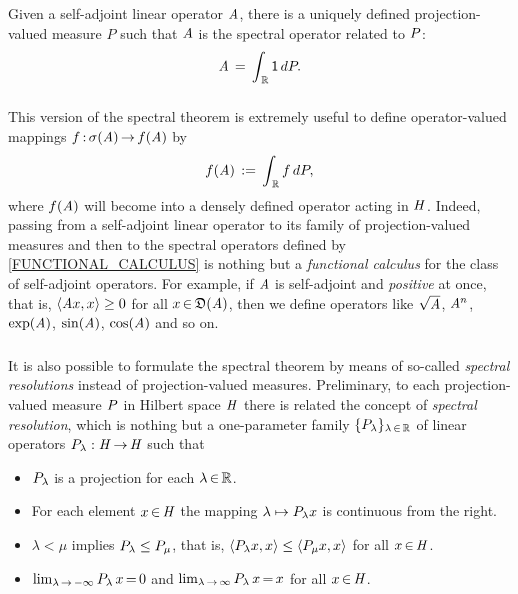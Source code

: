 \documentclass[11pt,twoside]{article}
\begin{document}
\begin{theorem}\label{SPECTRAL_THEOREM_VERSION_II}
Given a self-adjoint linear operator $\mathit{A}$,
there is a uniquely defined projection-valued measure $P$
such that $\mathit{A}$ is the spectral operator related to ${P}$:
\[
\mathit{A} \,=\, \int_{\,{\mathbb{R}}} {\mathsf{1}} \, d{P}.
\]
\end{theorem}

\subsubsection*{} %
This version of the spectral theorem is extremely useful
to define operator-valued mappings $f{\,:\,}\sigma(\mathit{A}) {\,\to\,} f(\mathit{A})$ by
\[
f(\mathit{A}) \,:=\, \int_{\,{\mathbb{R}}} f \, d{P},
\]
where $f(\mathit{A})$ will become into a densely defined operator
acting in $\mathit{H}$.
Indeed,
passing from a self-adjoint linear operator
to its family of projection-valued measures
and then to the spectral operators defined by \eqref{FUNCTIONAL_CALCULUS}
is nothing but a \textit{functional calculus}
for the class of self-adjoint operators.
For example, 
if $\mathit{A}$ is self-adjoint and \textit{positive} at once,
that is,
$\langle \mathit{A} x,x \rangle \geq 0$ for all $x {\,\in\,} \mathfrak{D}(\mathit{A})$,
then we define operators like $\sqrt{\mathit{A}}$, 
$\mathit{A}^n$, $\exp(\mathit{A})$, $\sin(\mathit{A})$, $\cos(\mathit{A})$ and so on.

%

\subsubsection*{} %
It is also possible to formulate the spectral theorem by means of so-called
\textit{spectral resolutions} instead of projection-valued measures.
Preliminary,
to each projection-valued measure ${P}$ in Hilbert space $\mathit{H}$
there is related the concept of \textit{spectral resolution},
which is nothing but a one-parameter family
$\{{P}_{\lambda}\}_{\lambda {\,\in\,} {\mathbb{R}}}$
of linear operators ${P}_{\lambda}:\mathit{H} {\,\to\,} \mathit{H}$
such that

\begin{itemize}[leftmargin=11mm]
\item[(R-1)]
${P}_{\lambda}$ is a projection for each $\lambda {\,\in\,} {\mathbb{R}}$.
\item[(R-2)]
For each element $x {\,\in\,} \mathit{H}$ the mapping
$\lambda \mapsto {P}_{\lambda} x$ is continuous from the right.
\item[(R-3)]
$\lambda < \mu$ implies ${P}_{\lambda} \leq {P}_{\mu}$,
that is,
$\langle {P}_{\lambda} x,x \rangle \leq \langle {P}_{\mu} x,x \rangle$
for all $x {\,\in\,} \mathit{H}$.
\item[(R-4)]
$\lim_{\lambda {\,\to\,} -\infty} {P}_{\lambda} \, x {\,=\,} 0$
and
$\lim_{\lambda {\,\to\,}  \infty} {P}_{\lambda}  \, x {\,=\,} x$
for all $x {\,\in\,} \mathit{H}$.
\end{itemize}
\end{document}
